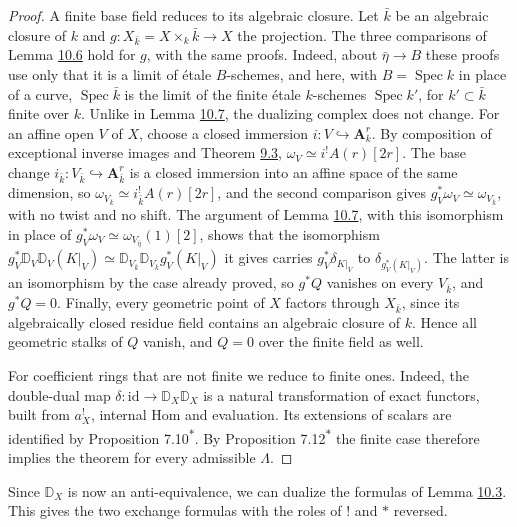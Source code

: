 \documentclass[11pt]{article}
\newcommand{\bpout}[1]{#1\textsuperscript{\hyperlink{bp-outside}{\ensuremath{\ast}}}}
\begin{document}
\begin{proof}[{Proof}]
A finite base field reduces to its algebraic closure. Let \(\bar k\) be an algebraic closure of \(k\) and \(g:X_{\bar k}=X\times_k\bar k\to X\) the projection. The three comparisons of Lemma \hyperref[bp119]{10.6} hold for \(g\), with the same proofs. Indeed, about \(\bar\eta\to B\) these proofs use only that it is a limit of étale \(B\)-schemes, and here, with \(B=\operatorname{Spec}k\) in place of a curve, \(\operatorname{Spec}\bar k\) is the limit of the finite étale \(k\)-schemes \(\operatorname{Spec}k'\), for \(k'\subset\bar k\) finite over \(k\). Unlike in Lemma \hyperref[bp122]{10.7}, the dualizing complex does not change. For an affine open \(V\) of \(X\), choose a closed immersion \(i:V\hookrightarrow\mathbf A^r_k\). By composition of exceptional inverse images and Theorem \hyperref[bp11]{9.3}, \(\omega_V\simeq i^!A(r)[2r]\). The base change \(i_{\bar k}:V_{\bar k}\hookrightarrow\mathbf A^r_{\bar k}\) is a closed immersion into an affine space of the same dimension, so \(\omega_{V_{\bar k}}\simeq i_{\bar k}^!A(r)[2r]\), and the second comparison gives \(g_V^*\omega_V\simeq\omega_{V_{\bar k}}\), with no twist and no shift. The argument of Lemma \hyperref[bp122]{10.7}, with this isomorphism in place of \(g_V^*\omega_V\simeq\omega_{V_{\bar\eta}}(1)[2]\), shows that the isomorphism \(g_V^*\mathbb D_V\mathbb D_V(K|_V)\simeq\mathbb D_{V_{\bar k}}\mathbb D_{V_{\bar k}}g_V^*(K|_V)\) it gives carries \(g_V^*\delta_{K|_V}\) to \(\delta_{g_V^*(K|_V)}\). The latter is an isomorphism by the case already proved, so \(g^*Q\) vanishes on every \(V_{\bar k}\), and \(g^*Q=0\). Finally, every geometric point of \(X\) factors through \(X_{\bar k}\), since its algebraically closed residue field contains an algebraic closure of \(k\). Hence all geometric stalks of \(Q\) vanish, and \(Q=0\) over the finite field as well.

For coefficient rings that are not finite we reduce to finite ones. Indeed, the double-dual map \(\delta:\mathrm{id}\to\mathbb D_X\mathbb D_X\) is a natural transformation of exact functors, built from \(a_X^!\), internal Hom and evaluation. Its extensions of scalars are identified by Proposition \bpout{7.10}. By Proposition \bpout{7.12} the finite case therefore implies the theorem for every admissible \(\Lambda\).
\end{proof}

\label{bp127}%
Since \(\mathbb D_X\) is now an anti-equivalence, we can dualize the formulas of Lemma \hyperref[bp110]{10.3}. This gives the two exchange formulas with the roles of \(!\) and \(*\) reversed.
\end{document}
